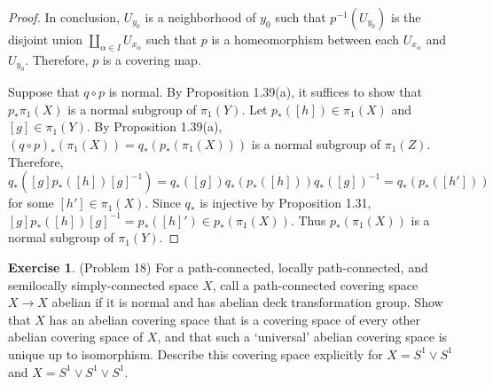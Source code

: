 \documentclass[12pt, psamsfonts]{amsart}
\theoremstyle{definition}
\newtheorem*{exer}{Exercise}
\theoremstyle{remark}
\numberwithin{equation}{section}
\begin{document}
\begin{proof}
  In conclusion, $U_{y_0}$ is a neighborhood of $y_0$ such that $p^{-1}(U_{y_0})$ is the disjoint union $\coprod_{\alpha \in I} U_{x_{\alpha}}$ such that $p$ is a homeomorphism between each $U_{x_{\alpha}}$ and $U_{y_0}$.
  Therefore, $p$ is a covering map.

  Suppose that $q \circ p$ is normal.
  By Proposition 1.39(a), it suffices to show that $p_*\pi_1(X)$ is a normal subgroup of $\pi_1(Y)$.
  Let $p_*([h]) \in \pi_1(X)$ and $[g] \in \pi_1(Y)$.
  By Proposition 1.39(a), $(q \circ p)_*(\pi_1(X)) = q_*(p_*(\pi_1(X)))$ is a normal subgroup of $\pi_1(Z)$.
  Therefore, $q_*([g] p_*([h]) [g]^{-1}) = q_*([g])q_*(p_*([h]))q_*([g])^{-1} = q_*(p_*([h']))$ for some $[h'] \in \pi_1(X)$.
  Since $q_*$ is injective by Proposition 1.31, $[g]p_*([h])[g]^{-1} = p_*([h]') \in p_*(\pi_1(X))$.
  Thus $p_*(\pi_1(X))$ is a normal subgroup of $\pi_1(Y)$.
\end{proof}

\begin{exer}{(Problem 18)}
  For a path-connected, locally path-connected, and semilocally simply-connected space $X$, call a path-connected covering space $X \rightarrow X$ abelian if it is normal and has abelian deck transformation group.
  Show that $X$ has an abelian covering space that is a covering space of every other abelian covering space of $X$, and that such a `universal' abelian covering space is unique up to isomorphism.
  Describe this covering space explicitly for $X = S^1 \vee S^1$ and $X = S^1 \vee S^1 \vee S^1$.
\end{exer}
\end{document}

